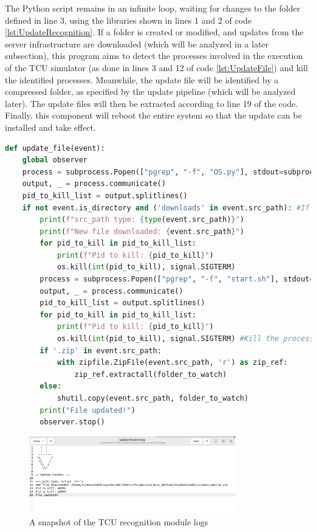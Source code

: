 The Python script remains in an infinite loop, waiting for changes to the folder defined in line 3, using the libraries shown in lines 1 and 2 of code \ref{lst:UpdateRecognition}.
If a folder is created or modified, and updates from the server infrastructure are downloaded (which will be analyzed in a later subsection), this program aims to detect the processes involved in the execution of the TCU simulator (as done in lines 3 and 12 of code \ref{lst:UpdateFile}) and kill the identified processes. Meanwhile, the update file will be identified by a compressed folder, as specified by the update pipeline (which will be analyzed later). The update files will then be extracted according to line 19 of the code. Finally, this component will reboot the entire system so that the update can be installed and take effect.
\begin{lstlisting}[language=Python, caption={Code for performing actions when the designated download folder is changed}, label=lst:UpdateFile]
def update_file(event):
    global observer
    process = subprocess.Popen(["pgrep", "-f", "OS.py"], stdout=subprocess.PIPE, text=True)
    output, _ = process.communicate()
    pid_to_kill_list = output.splitlines()
    if not event.is_directory and ('downloads' in event.src_path): #If the new item is a directory
        print(f"src_path type: {type(event.src_path)}")
        print(f"New file downloaded: {event.src_path}")
        for pid_to_kill in pid_to_kill_list:
            print(f"Pid to kill: {pid_to_kill}")
            os.kill(int(pid_to_kill), signal.SIGTERM)    
        process = subprocess.Popen(["pgrep", "-f", "start.sh"], stdout=subprocess.PIPE, text=True)
        output, _ = process.communicate()
        pid_to_kill_list = output.splitlines()
        for pid_to_kill in pid_to_kill_list:
            print(f"Pid to kill: {pid_to_kill}")
            os.kill(int(pid_to_kill), signal.SIGTERM) #Kill the process
        if '.zip' in event.src_path:
            with zipfile.ZipFile(event.src_path, 'r') as zip_ref:
                zip_ref.extractall(folder_to_watch)
        else:
            shutil.copy(event.src_path, folder_to_watch)          
        print("File updated!")
        observer.stop()
\end{lstlisting}

\begin{figure}[h]  %
    \centering
    \includegraphics[width=0.8\textwidth]{images/watchdog_log.png}  %
    \caption{A snapshot of the TCU recognition module logs}
    \label{fig:Watchdog_log}
\end{figure}

